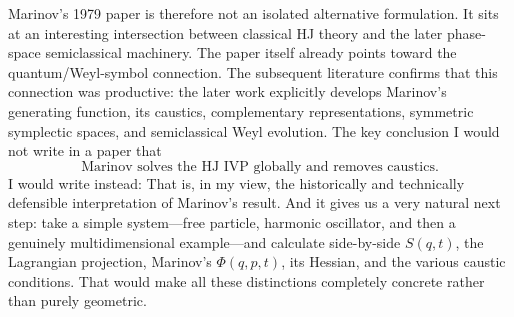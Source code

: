 Marinov's 1979 paper is therefore not an isolated alternative formulation. It sits at an interesting intersection between classical HJ theory and the later phase-space semiclassical machinery. The paper itself already points toward the quantum/Weyl-symbol connection.
The subsequent literature confirms that this connection was productive: the later work explicitly develops Marinov's generating function, its caustics, complementary representations, symmetric symplectic spaces, and semiclassical Weyl evolution.
The key conclusion
I would not write in a paper that
$$ \boxed{\text{Marinov solves the HJ IVP globally and removes caustics.}} $$
I would write instead:
That is, in my view, the historically and technically defensible interpretation of Marinov's result.
And it gives us a very natural next step: take a simple system—free particle, harmonic oscillator, and then a genuinely multidimensional example—and calculate side-by-side \(S(q,t)\), the Lagrangian projection, Marinov's \(\Phi(q,p,t)\), its Hessian, and the various caustic conditions. That would make all these distinctions completely concrete rather than purely geometric.
